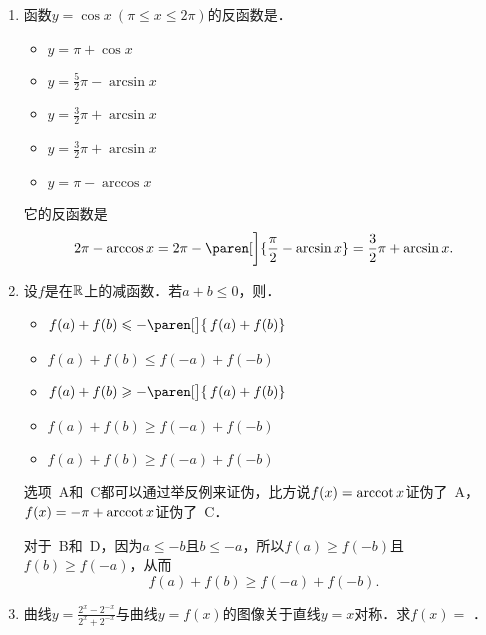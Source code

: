 \begin{enumerate}
\item 函数\(y = \cos x\ (\pi \le x \le 2\pi)\)的反函数是\uline{\makebox[6em]{}}．
  \begin{itemize}
    \renewcommand{\labelitemi}{\faCircleThin}
  \item \(y = \pi + \cos x\)
  \item \(y = \frac52\pi - \arcsin x\)
    \ifshowsol
    \item[\faCircle] \(y = \frac32\pi + \arcsin x\)
    \else
    \item \(y = \frac32\pi + \arcsin x\)
    \fi
  \item \(y = \pi - \arccos x\)
  \end{itemize}

  \ifshowsol
    它的反函数是
    \begin{equation*}
      2\pi - \arccos x
      = 2\pi - \paren[\bigg]{\frac\pi2 - \arcsin x}
      = \frac32\pi + \arcsin x.
    \end{equation*}
  \fi

\item 设\(f\)是在\(\mathbb{R}\)上的减函数．若\(a + b \le 0\)，则\uline{\makebox[6em]{}}．
  \begin{itemize}
    \renewcommand{\labelitemi}{\faCircleThin}
  \item \(f(a) + f(b) \le -\paren[\big]{\,f(a) + f(b)}\)
  \item \(f(a) + f(b) \le f(-a) + f(-b)\)
  \item \(f(a) + f(b) \ge -\paren[\big]{\,f(a) + f(b)}\)
    \ifshowsol
    \item[\faCircle] \(f(a) + f(b) \ge f(-a) + f(-b)\)
    \else
    \item \(f(a) + f(b) \ge f(-a) + f(-b)\)
    \fi
  \end{itemize}

  \ifshowsol
    选项~A和~C都可以通过举反例来证伪，比方说\(f(x) = \operatorname{arccot} x\)证伪了~A，\(f(x) = -\pi + \operatorname{arccot} x\)证伪了~C．

    对于~B和~D，因为\(a \le -b\)且\(b \le -a\)，所以\(f(a) \ge f(-b)\)且\(f(b) \ge f(-a)\)，从而
    \begin{equation*}
      f(a) + f(b) \ge f(-a) + f(-b).
    \end{equation*}
  \fi

\item 曲线\(y = \frac{2^x-2^{-x}}{2^x+2^{-x}}\)与曲线\(y = f(x)\)的图像关于直线\(y = x\)对称．求\(f(x) =\)
  \ifshowsol
    {\setlength{\ULdepth}{1.15ex}%
      \uline{}}．


\end{enumerate}
